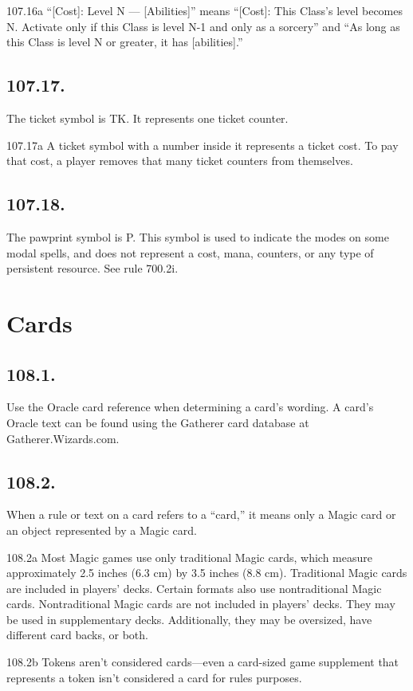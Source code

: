 107.16a “[Cost]: Level N — [Abilities]” means “[Cost]: This Class’s level becomes N. Activate only if this Class is level N-1 and only as a sorcery” and “As long as this Class is level N or greater, it has [abilities].”

\subsection*{107.17.}
The ticket symbol is {TK}. It represents one ticket counter.

107.17a A ticket symbol with a number inside it represents a ticket cost. To pay that cost, a player removes that many ticket counters from themselves.

\subsection*{107.18.}
The pawprint symbol is {P}. This symbol is used to indicate the modes on some modal spells, and does not represent a cost, mana, counters, or any type of persistent resource. See rule 700.2i.

\section{Cards}
\subsection*{108.1.}
Use the Oracle card reference when determining a card’s wording. A card’s Oracle text can be found using the Gatherer card database at Gatherer.Wizards.com.

\subsection*{108.2.}
When a rule or text on a card refers to a “card,” it means only a Magic card or an object represented by a Magic card.

108.2a Most Magic games use only traditional Magic cards, which measure approximately 2.5 inches (6.3 cm) by 3.5 inches (8.8 cm). Traditional Magic cards are included in players’ decks. Certain formats also use nontraditional Magic cards. Nontraditional Magic cards are not included in players’ decks. They may be used in supplementary decks. Additionally, they may be oversized, have different card backs, or both.

108.2b Tokens aren’t considered cards—even a card-sized game supplement that represents a token isn’t considered a card for rules purposes.

